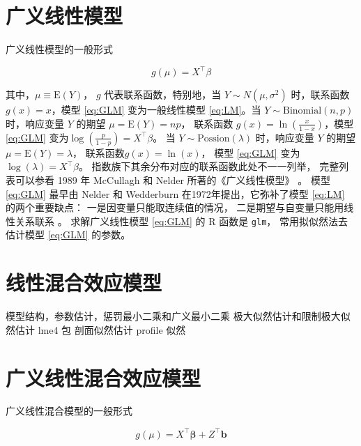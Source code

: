 \documentclass[12pt,a4paper,UTF8,twoside]{book}
\theoremstyle{definition}
\theoremstyle{definition}
\theoremstyle{definition}
\theoremstyle{remark}
\begin{document}
\hypertarget{Generalized-Linear-Models}{%
\section{广义线性模型}\label{Generalized-Linear-Models}}

广义线性模型的一般形式

\begin{equation}
g(\mu) = X^{\top}\beta  \label{eq:GLM}
\end{equation}

\noindent 其中，\(\mu \equiv \mathrm{E}(Y)\)， \(g\)
代表联系函数，特别地，当 \(Y \sim N(\mu,\sigma^2)\) 时，联系函数
\(g(x) = x\)，模型 \eqref{eq:GLM} 变为一般线性模型 \eqref{eq:LM}。当
\(Y \sim \mathrm{Binomial}(n,p)\) 时，响应变量 \(Y\) 的期望
\(\mu =\mathrm{E}(Y) = np\)， 联系函数 \(g(x)=\ln(\frac{x}{1-x})\)，模型
\eqref{eq:GLM} 变为\(\log(\frac{p}{1-p})=X^{\top}\beta\)。 当
\(Y \sim \mathrm{Possion}(\lambda)\) 时，响应变量 \(Y\) 的期望
\(\mu =\mathrm{E}(Y) = \lambda\)， 联系函数\(g(x) = \ln(x)\)， 模型
\eqref{eq:GLM} 变为 \(\log(\lambda) = X^{\top}\beta\)。
指数族下其余分布对应的联系函数此处不一一列举， 完整列表可以参看 1989 年
McCullagh 和 Nelder 所著的《广义线性模型》 \citep{McCullagh1989}。 模型
\eqref{eq:GLM} 最早由 Nelder 和 Wedderburn
在1972年提出\citep{Nelder1972}，它弥补了模型 \eqref{eq:LM}
的两个重要缺点： 一是因变量只能取连续值的情况，
二是期望与自变量只能用线性关系联系 \citep{Chen2011}。 求解广义线性模型
\eqref{eq:GLM} 的 R 函数是 \texttt{glm}， 常用拟似然法去估计模型
\eqref{eq:GLM} 的参数。

\hypertarget{Linear-Mixed-Effects-Models}{%
\section{线性混合效应模型}\label{Linear-Mixed-Effects-Models}}

模型结构，参数估计，惩罚最小二乘和广义最小二乘
极大似然估计和限制极大似然估计 lme4 包 \citep{Bates2015} 剖面似然估计
profile 似然

\hypertarget{Generalized-Linear-Mixed-Effects-Models}{%
\section{广义线性混合效应模型}\label{Generalized-Linear-Mixed-Effects-Models}}

广义线性混合模型的一般形式

\begin{equation}
g(\mu) = X^{\top}\boldsymbol{\beta} + Z^{\top}\mathbf{b}  \label{eq:GLMM}
\end{equation}
\end{document}
